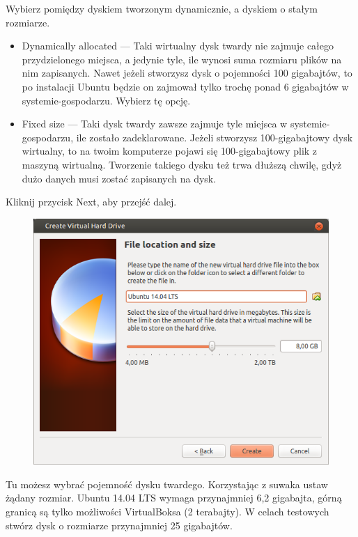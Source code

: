Wybierz pomiędzy dyskiem tworzonym dynamicznie, a dyskiem o stałym rozmiarze.
\begin{itemize}
\item \textcolor{ubuntu_orange}{Dynamically allocated} --- Taki wirtualny dysk twardy nie zajmuje całego przydzielonego miejsca, a jedynie tyle, ile wynosi suma rozmiaru plików na nim zapisanych. Nawet jeżeli stworzysz dysk o pojemności 100 gigabajtów, to po instalacji Ubuntu będzie on zajmował tylko trochę ponad 6 gigabajtów w systemie-gospodarzu. Wybierz tę opcję.
\item \textcolor{ubuntu_orange}{Fixed size} --- Taki dysk twardy zawsze zajmuje tyle miejsca w systemie-gospodarzu, ile zostało zadeklarowane. Jeżeli stworzysz 100-gigabajtowy dysk wirtualny, to na twoim komputerze pojawi się 100-gigabajtowy plik z maszyną wirtualną. Tworzenie takiego dysku też trwa dłuższą chwilę, gdyż dużo danych musi zostać zapisanych na dysk.
\end{itemize}
\begin{flushright}
Kliknij przycisk \textcolor{ubuntu_orange}{Next}, aby przejść dalej.
\end{flushright}

\begin{figure}
	\vspace{-10pt}
	\includegraphics[width=\linewidth]{images/virtualbox_wizard6.png}
\end{figure}

Tu możesz wybrać pojemność dysku twardego. Korzystając z suwaka ustaw żądany rozmiar. Ubuntu 14.04 LTS wymaga przynajmniej 6,2 gigabajta, górną granicą są tylko możliwości VirtualBoksa (2 terabajty). W celach testowych stwórz dysk o rozmiarze przynajmniej 25 gigabajtów.


